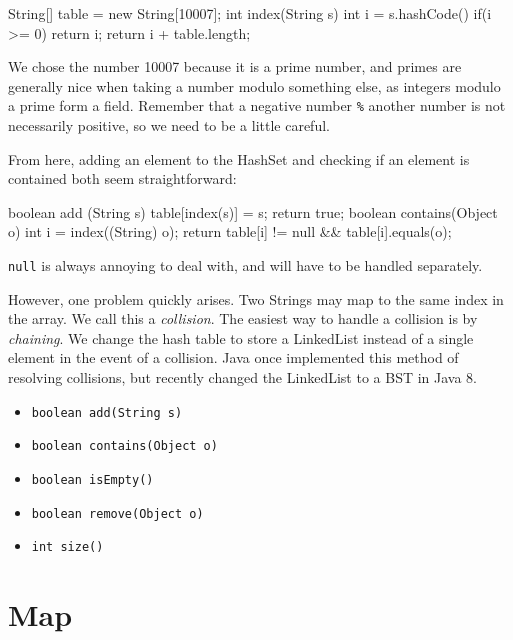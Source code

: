 \documentclass[11pt]{book}
\begin{document}
\begin{mylstlisting}
String[] table = new String[10007];
int index(String s) {
	int i = s.hashCode() %
    if(i >= 0)
    	return i;
	return i + table.length;
}
\end{mylstlisting}

We chose the number 10007 because it is a prime number, and primes are generally nice when taking a number modulo something else, as integers modulo a prime form a field. Remember that a negative number \texttt{\%} another number is not necessarily positive, so we need to be a little careful.

From here, adding an element to the HashSet and checking if an element is contained both seem straightforward:

\begin{mylstlisting}
boolean add (String s) {
	table[index(s)] = s;
    return true;
}
boolean contains(Object o) {
    int i = index((String) o);
	return table[i] != null && table[i].equals(o);
}
\end{mylstlisting}

\texttt{null} is always annoying to deal with, and will have to be handled separately.

However, one problem quickly arises. Two Strings may map to the same index in the array. We call this a \textit{collision}. The easiest way to handle a collision is by \textit{chaining}. We change the hash table to store a LinkedList instead of a single element in the event of a collision. Java once implemented this method of resolving collisions, but recently changed the LinkedList to a BST in Java 8.

\begin{itemize}

\item
\texttt{boolean add(String s)}

\item
\texttt{boolean contains(Object o)}

\item
\texttt{boolean isEmpty()}

\item
\texttt{boolean remove(Object o)}

\item
\texttt{int size()}

\end{itemize}

\section{Map}
\end{document}
